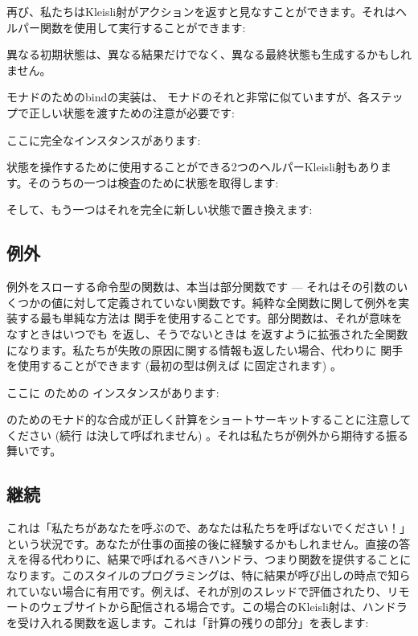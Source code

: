 再び、私たちはKleisli射がアクションを返すと見なすことができます。それはヘルパー関数を使用して実行することができます: 

異なる初期状態は、異なる結果だけでなく、異なる最終状態も生成するかもしれません。

 モナドのためのbindの実装は、 モナドのそれと非常に似ていますが、各ステップで正しい状態を渡すための注意が必要です: 

ここに完全なインスタンスがあります: 

状態を操作するために使用することができる2つのヘルパーKleisli射もあります。そのうちの一つは検査のために状態を取得します: 

そして、もう一つはそれを完全に新しい状態で置き換えます: 


\subsection{例外}

例外をスローする命令型の関数は、本当は部分関数です --- それはその引数のいくつかの値に対して定義されていない関数です。純粋な全関数に関して例外を実装する最も単純な方法は  関手を使用することです。部分関数は、それが意味をなすときはいつでも  を返し、そうでないときは  を返すように拡張された全関数になります。私たちが失敗の原因に関する情報も返したい場合、代わりに  関手を使用することができます (最初の型は例えば  に固定されます) 。

ここに  のための  インスタンスがあります: 

 のためのモナド的な合成が正しく計算をショートサーキットすることに注意してください (続行  は決して呼ばれません) 。それは私たちが例外から期待する振る舞いです。

\subsection{継続}

これは「私たちがあなたを呼ぶので、あなたは私たちを呼ばないでください！」という状況です。あなたが仕事の面接の後に経験するかもしれません。直接の答えを得る代わりに、結果で呼ばれるべきハンドラ、つまり関数を提供することになります。このスタイルのプログラミングは、特に結果が呼び出しの時点で知られていない場合に有用です。例えば、それが別のスレッドで評価されたり、リモートのウェブサイトから配信される場合です。この場合のKleisli射は、ハンドラを受け入れる関数を返します。これは「計算の残りの部分」を表します: 


